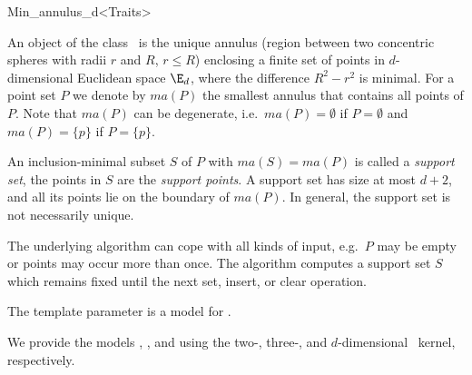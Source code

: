 
\begin{ccRefClass}{Min_annulus_d<Traits>}


\ccSaveThreeColumns
\cgalMinAnnulusLayout

\ccDefinition

An object of the class \ccRefName\ is the unique annulus (region between
two concentric spheres with radii $r$ and $R$, $r \leq R$) enclosing a
finite set of points in $d$-dimensional Euclidean space $\E_d$, where the
difference $R^2-r^2$ is minimal. For a point set $P$ we denote by $ma(P)$
the smallest annulus that contains all points of $P$.  Note that $ma(P)$
can be degenerate,
i.e.~$ma(P)=\emptyset$ if
$P=\emptyset$ and $ma(P)=\{p\}$ if
$P=\{p\}$.

An inclusion-minimal subset $S$ of $P$ with $ma(S)=ma(P)$ is called a
\emph{support set},
the points in $S$ are the \emph{support points}.  A support set has size at
most $d+2$, and all its points lie on the boundary of $ma(P)$. In general,
the support set is not necessarily unique.

The underlying algorithm can cope with all kinds of input, e.g.~$P$ may be
empty or points may occur more than once. The algorithm computes a support
set $S$ which remains fixed until the next set, insert, or clear operation.


\ccRequirements
\ccIndexRequirements

The template parameter  is a model for .

We provide the models ,
, and  using the
two-, three-, and $d$-dimensional \cgal~kernel, respectively.

\ccTypes
\ccIndexClassTypes



\end{ccRefClass}

